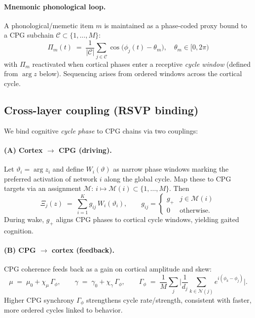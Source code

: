 \documentclass{article}
\begin{document}
\paragraph{Mnemonic phonological loop.} A phonological/memetic item $m$ is maintained as a phase-coded proxy bound to a CPG subchain $\mathcal{C}\subset\{1,\dots,M\}$:
\begin{equation}
\textstyle \Pi_m(t) \;=\; \frac{1}{|\mathcal{C}|}\sum_{j\in\mathcal{C}} \cos\big(\phi_j(t)-\theta_m\big),
\quad \theta_m\in[0,2\pi)
\label{eq:proxy}
\end{equation}
with $\Pi_m$ reactivated when cortical phases enter a receptive \emph{cycle window} (defined from $\arg z$ below). Sequencing arises from ordered windows across the cortical cycle.

\subsection{Cross-layer coupling (RSVP binding)}
We bind cognitive \emph{cycle phase} to CPG chains via two couplings:

\paragraph{(A) Cortex $\rightarrow$ CPG (driving).} Let $\vartheta_i=\arg z_i$ and define $W_i(\vartheta)$ as narrow phase windows marking the preferred activation of network $i$ along the global cycle. Map these to CPG targets via an assignment $\mathcal{M}\!:\, i\mapsto \mathcal{M}(i)\subset\{1,\dots,M\}$. Then
\begin{equation}
\Xi_j(z) \;=\; \sum_{i=1}^K g_{ij}\, W_i(\vartheta_i), \qquad
g_{ij} =
\begin{cases}
g_+ & j\in \mathcal{M}(i)\\
0 & \text{otherwise.}
\end{cases}
\label{eq:drive}
\end{equation}
During wake, $g_+$ aligns CPG phases to cortical cycle windows, yielding gaited cognition.

\paragraph{(B) CPG $\rightarrow$ cortex (feedback).} CPG coherence feeds back as a gain on cortical amplitude and skew:
\begin{equation}
\mu \;=\; \mu_0 + \chi_\mu\,\Gamma_\phi,\qquad
\gamma \;=\; \gamma_0 + \chi_\gamma\,\Gamma_\phi,\qquad
\Gamma_\phi \;=\; \frac{1}{M}\sum_{j}\Big|\frac{1}{d_j}\sum_{k\in\mathcal{N}(j)} e^{i(\phi_k-\phi_j)}\Big|.
\label{eq:feedback}
\end{equation}
Higher CPG synchrony $\Gamma_\phi$ strengthens cycle rate/strength, consistent with faster, more ordered cycles linked to behavior.
\end{document}
